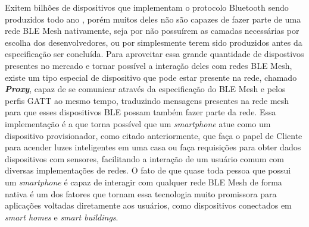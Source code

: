 \documentclass[../monografia.tex]{subfiles}
\begin{document}
Exitem bilhões de dispositivos que implementam o protocolo Bluetooth sendo produzidos todo ano \cite{ble-market-update}, porém muitos deles não são capazes de fazer parte de uma rede BLE Mesh nativamente, seja por não possuírem as camadas necessárias por escolha dos desenvolvedores, ou por simplesmente terem sido produzidos antes da especificação ser concluída. Para aproveitar essa grande quantidade de dispostivos presentes no mercado e tornar possível a interação deles com redes BLE Mesh, existe um tipo especial de dispositivo que pode estar presente na rede, chamado \textit{\textbf{Proxy}}, capaz de se comunicar através da especificação do BLE Mesh e pelos perfis GATT \cite{BLE-GATT} ao mesmo tempo, traduzindo mensagens presentes na rede mesh para que esses dispositivos BLE possam também fazer parte da rede. Essa implementação é a que torna possível que um \textit{smartphone} atue como um dispositivo provisionador, como citado anteriormente, que faça o papel de Cliente para acender luzes inteligentes em uma casa ou faça requisições para obter dados dispositivos com sensores, facilitando a interação de um usuário comum com diversas implementações de redes. O fato de que quase toda pessoa que possui um \textit{smartphone} é capaz de interagir com qualquer rede BLE Mesh de forma nativa é um dos fatores que tornam essa tecnologia muito promissora para aplicações voltadas diretamente aos usuários, como dispositivos conectados em \textit{smart homes} e \textit{smart buildings}.
\end{document}
